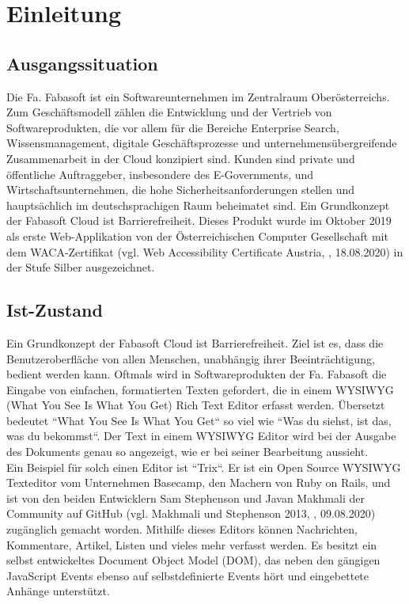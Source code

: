\chapter{Einleitung}
\section{Ausgangssituation}
Die Fa. Fabasoft ist ein Softwareunternehmen im Zentralraum Oberösterreichs. Zum Geschäftsmodell zählen die Entwicklung und der Vertrieb von Softwareprodukten, die vor allem für die Bereiche Enterprise Search, Wissensmanagement, digitale Geschäftsprozesse und unternehmensübergreifende Zusammenarbeit in der Cloud konzipiert sind. Kunden sind private und öffentliche Auftraggeber, insbesondere des E-Governments, und Wirtschaftsunternehmen, die hohe Sicherheitsanforderungen stellen und hauptsächlich im deutschsprachigen Raum beheimatet sind. Ein Grundkonzept der Fabasoft Cloud ist Barrierefreiheit. Dieses Produkt wurde im Oktober 2019 als erste Web-Applikation von der Österreichischen Computer Gesellschaft mit dem WACA-Zertifikat (vgl. Web Accessibility Certificate Austria, \cite{waca_zertifikate_2020}, 18.08.2020) in der Stufe Silber ausgezeichnet.

\section{Ist-Zustand}
Ein Grundkonzept der Fabasoft Cloud ist Barrierefreiheit. Ziel ist es, dass die Benutzeroberfläche von allen Menschen, unabhängig ihrer Beeinträchtigung, bedient werden kann.
Oftmals wird in Softwareprodukten der Fa. Fabasoft die Eingabe von einfachen, formatierten Texten gefordert, die in einem WYSIWYG (What You See Is What You Get) Rich Text Editor erfasst werden. 
Übersetzt bedeutet ``What You See Is What You Get`` so viel wie ``Was du siehst, ist das, was du bekommst``. Der Text in einem WYSIWYG Editor wird bei der Ausgabe des Dokuments genau so angezeigt, wie er bei seiner Bearbeitung aussieht.\\
Ein Beispiel für solch einen Editor ist ``Trix``. Er ist ein Open Source WYSIWYG Texteditor vom Unternehmen Basecamp, den Machern von Ruby on Rails, und ist von den beiden Entwicklern Sam Stephenson und Javan Makhmali der Community auf GitHub (vgl. Makhmali und Stephenson 2013, \cite{basecamp_trix_2013}, 09.08.2020) zugänglich gemacht worden. Mithilfe dieses Editors können Nachrichten, Kommentare, Artikel, Listen und vieles mehr verfasst werden. Es besitzt ein selbst entwickeltes Document Object Model (DOM), das neben den gängigen JavaScript Events ebenso auf selbstdefinierte Events hört und eingebettete Anhänge unterstützt.

